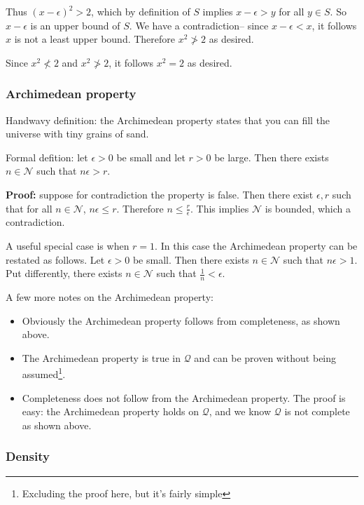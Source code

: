 Thus ${(x-\epsilon)}^{2}>2$, which by definition of $S$ implies
$x-\epsilon>y$ for all $y\in S$. So $x-\epsilon$ is an upper bound of
$S$. We have a contradiction-- since $x-\epsilon<x$, it follows $x$ is not a
least upper bound. Therefore $x^{2}\not>2$ as desired.

\vs

Since $x^{2}\not<2$ and $x^{2}\not>2$, it follows $x^{2}=2$ as
desired.


\subsubsection*{Archimedean property}
Handwavy definition: the Archimedean property states that you can fill
the universe with tiny grains of sand.

\vs

Formal defition: let $\epsilon>0$ be small and let $r>0$ be large. Then there
exists $n\in\mathcal{N}$ such that $n\epsilon>r$.

\vs

\textbf{Proof:} suppose for contradiction the property is false. Then
there exist $\epsilon, r$ such that for all $n\in\mathcal{N}$, $n\epsilon\leq r$. Therefore
$n\leq\frac{r}{\epsilon}$. This implies $\mathcal{N}$ is bounded, which a contradiction.

\vs

A useful special case is when $r=1$. In this case the Archimedean
property can be restated as follows. Let $\epsilon>0$ be small. Then there
exists $n\in\mathcal{N}$ such that $n\epsilon>1$. Put differently, there exists
$n\in\mathcal{N}$ such that $\frac{1}{n}<\epsilon$.

A few more notes on the Archimedean property:
\begin{itemize}
\item Obviously the Archimedean property follows from completeness, as
  shown above.
\item The Archimedean property is true in $\mathcal{Q}$ and can be proven
  without being assumed\footnote{Excluding the proof here, but it's
    fairly simple}.
\item Completeness does not follow from the Archimedean property. The
  proof is easy: the Archimedean property holds on $\mathcal{Q}$, and we know
  $\mathcal{Q}$ is not complete as shown above.
\end{itemize}


\subsubsection*{Density}


